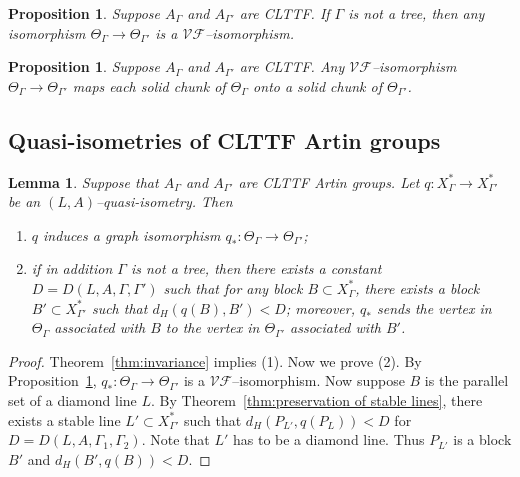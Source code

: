 \documentclass[11pt]{amsart}
\newcommand {\V}{\mathcal V}
\newcommand {\F}{\mathcal F}
\newtheorem{lemma}[theorem]{Lemma}
\newtheorem{prop}[theorem]{Proposition}
\theoremstyle{definition}
\newcommand{\Xa}{X^{\ast}}
\begin{document}
\begin{prop}
	\label{prop:VF}
	\cite[Proposition 41]{MR2174269} Suppose $A_\Gamma$ and $A_{\Gamma'}$ are CLTTF. If $\Gamma$ is not a tree, then any isomorphism $\Theta_\Gamma\to\Theta_{\Gamma'}$ is a $\V\F$--isomorphism.
\end{prop}

\begin{prop}
	\label{prop:chunk}
\cite[Proposition 23]{MR2174269} Suppose $A_\Gamma$ and $A_{\Gamma'}$ are CLTTF. Any $\V\F$--isomorphism $\Theta_\Gamma\to\Theta_{\Gamma'}$ maps each solid chunk of $\Theta_\Gamma$	onto a solid chunk of $\Theta_{\Gamma'}$.
\end{prop}





\subsection{Quasi-isometries of CLTTF Artin groups}
\label{subsec:quasi-isometries}
\begin{lemma}
	\label{lem:graph}
	Suppose that $A_\Gamma$ and $A_{\Gamma'}$ are CLTTF Artin groups. Let $q\colon \Xa_\Gamma\to \Xa_{\Gamma'}$ be an $(L,A)$--quasi-isometry. Then 
	\begin{enumerate}
		\item $q$ induces a graph isomorphism $q_\ast\colon \Theta_\Gamma\to\Theta_{\Gamma'}$;
		\item if in addition $\Gamma$ is not a tree, then there exists a constant $D=D(L,A,\Gamma,\Gamma')$ such that for any block $B\subset\Xa_\Gamma$, there exists a block $B'\subset\Xa_{\Gamma'}$ such that $d_H(q(B),B')<D$; moreover, $q_\ast$ sends the vertex in $\Theta_\Gamma$ associated with $B$ to the vertex in $\Theta_{\Gamma'}$ associated with $B'$.
	\end{enumerate}
\end{lemma}

\begin{proof}
Theorem~\ref{thm:invariance} implies (1). Now we prove (2). By Proposition~\ref{prop:VF}, $q_{\ast}\colon \Theta_\Gamma\to\Theta_{\Gamma'}$ is a $\V\F$--iso\-mor\-phism. Now suppose $B$ is the parallel set of a diamond line $L$. By Theorem~\ref{thm:preservation of stable lines}, there exists a stable line $L'\subset\Xa_{\Gamma'}$ such that $d_H(P_{L'},q(P_L))<D$ for $D=D(L,A,\Gamma_1,\Gamma_2)$. Note that $L'$ has to be a diamond line. Thus $P_{L'}$ is a block $B'$ and $d_H(B',q(B))<D$. 
\end{proof}
\end{document}
